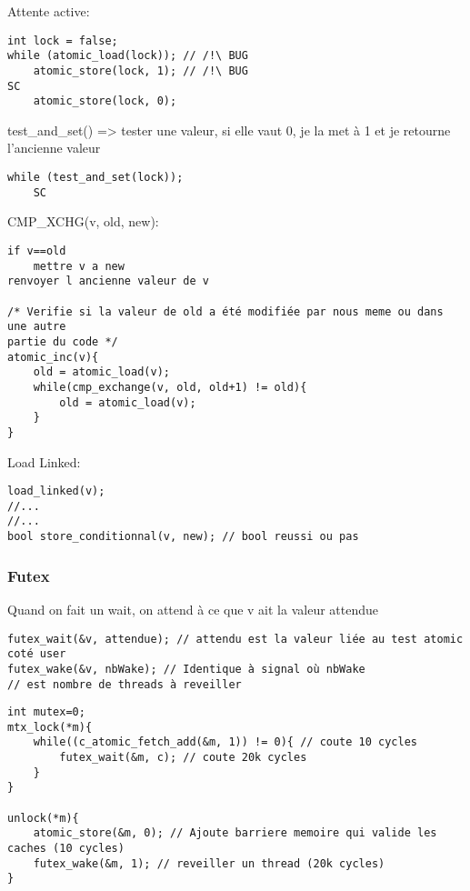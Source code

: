 \documentclass[11pt]{article}
\begin{document}
Attente active:
\begin{verbatim}
int lock = false;
while (atomic_load(lock)); // /!\ BUG
    atomic_store(lock, 1); // /!\ BUG
SC
    atomic_store(lock, 0);
\end{verbatim}

\pagebreak

test\_and\_set() => tester une valeur, si elle vaut 0, je la met à 1 et je retourne l'ancienne valeur
\begin{verbatim}
while (test_and_set(lock));
    SC
\end{verbatim}

CMP\_XCHG(v, old, new):
\begin{verbatim}
if v==old
    mettre v a new
renvoyer l ancienne valeur de v

/* Verifie si la valeur de old a été modifiée par nous meme ou dans une autre 
partie du code */
atomic_inc(v){
    old = atomic_load(v);
    while(cmp_exchange(v, old, old+1) != old){
        old = atomic_load(v);
    }
}
\end{verbatim}

Load Linked:
\begin{verbatim}
load_linked(v);
//...
//...    
bool store_conditionnal(v, new); // bool reussi ou pas

\end{verbatim}

\pagebreak

\subsubsection{Futex}

Quand on fait un wait, on attend à ce que v ait la valeur attendue
\begin{verbatim}
futex_wait(&v, attendue); // attendu est la valeur liée au test atomic coté user
futex_wake(&v, nbWake); // Identique à signal où nbWake 
// est nombre de threads à reveiller
\end{verbatim}

\begin{verbatim}
int mutex=0;
mtx_lock(*m){
    while((c_atomic_fetch_add(&m, 1)) != 0){ // coute 10 cycles
        futex_wait(&m, c); // coute 20k cycles
    }
}

unlock(*m){
    atomic_store(&m, 0); // Ajoute barriere memoire qui valide les caches (10 cycles)
    futex_wake(&m, 1); // reveiller un thread (20k cycles)
}
\end{verbatim}
\end{document}
